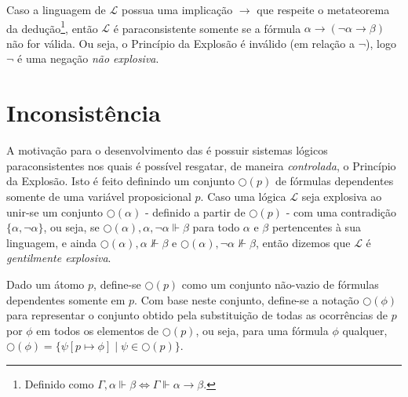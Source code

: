 Caso a linguagem de $\mathcal{L}$ possua uma implicação $\rightarrow$ que respeite o metateorema da dedução\footnote{Definido como $\Gamma, \alpha \Vdash \beta \Longleftrightarrow  \Gamma\Vdash \alpha \rightarrow \beta$.}, então $\mathcal{L}$ é paraconsistente somente se a fórmula $\alpha \rightarrow (\neg \alpha \rightarrow \beta)$ não for válida. Ou seja, o Princípio da Explosão é inválido (em relação a $\neg$), logo $\neg$ é uma negação \textit{não explosiva}.

\section{Inconsistência}

A motivação para o desenvolvimento das \lfis{} é possuir sistemas lógicos paraconsistentes nos quais é possível resgatar, de maneira \textit{controlada}, o Princípio da Explosão. Isto é feito definindo um conjunto $\bigcirc(p)$ de fórmulas dependentes somente de uma variável proposicional $p$. Caso uma lógica $\mathcal{L}$ seja explosiva ao unir-se um conjunto $\bigcirc(\alpha)$ {-} definido a partir de $\bigcirc(p)$ {-} com uma contradição $\{\alpha, \neg \alpha\}$, ou seja, se $\bigcirc(\alpha), \alpha, \neg \alpha \Vdash \beta$ para todo $\alpha$ e $\beta$ pertencentes à sua linguagem, e ainda $\bigcirc(\alpha), \alpha \nVdash \beta$ e $\bigcirc(\alpha), \neg \alpha \nVdash \beta$, então dizemos que $\mathcal{L}$ é \textit{gentilmente explosiva}.

\begin{notacao}
    Dado um átomo $p$, define-se $\bigcirc(p)$ como um conjunto não-vazio de fórmulas dependentes somente em $p$. Com base neste conjunto, define-se a notação $\bigcirc(\phi)$ para representar o conjunto obtido pela substituição de todas as ocorrências de $p$ por $\phi$ em todos os elementos de $\bigcirc(p)$, ou seja, para uma fórmula $\phi$ qualquer, $\bigcirc(\phi) = \{\psi[p \mapsto \phi] \; | \; \psi \in \bigcirc(p)\}$.
\end{notacao}



